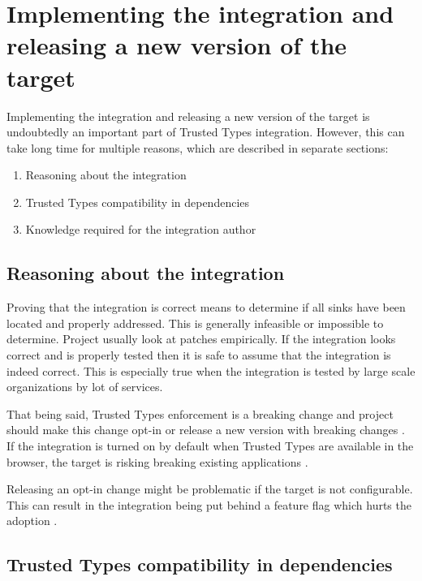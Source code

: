 \section{Implementing the integration and releasing a new version of the target}

Implementing the integration and releasing a new version of the target is undoubtedly an important part
of Trusted Types integration. However, this can take long time for multiple reasons, which are
described in separate sections:

\begin{enumerate}
  \item Reasoning about the integration
  \item Trusted Types compatibility in dependencies
  \item Knowledge required for the integration author
\end{enumerate}

\subsection{Reasoning about the integration}
\label{sub:reason_about_integration}

Proving that the integration is correct means to determine if all sinks have been located and
properly addressed. This is generally infeasible or impossible to determine. Project usually look at
patches empirically. If the integration looks correct and is properly tested then it is safe to
assume that the integration is indeed correct. This is especially true when the integration is
tested by large scale organizations by lot of services.

That being said, Trusted Types enforcement is a breaking change and project should make this change
opt-in or release a new version with breaking changes \cite{dom_purify_major_version}. If the
integration is turned on by default when Trusted Types are available in the browser, the target is
risking breaking existing applications \cite{dom_purify_breakage}.

Releasing an opt-in change might be problematic if the target is not configurable. This can result
in the integration being put behind a feature flag which hurts the adoption
\cite{react_tt_feature_flag}.

\subsection{Trusted Types compatibility in dependencies}
\label{sub:tt_compatibility_in_deps}

